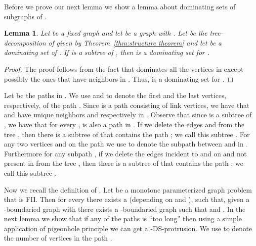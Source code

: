 \documentclass[11pt]{article}
\newtheorem{lemma}{Lemma}
\begin{document}
Before we prove our next lemma we show a lemma about dominating sets of subgraphs of .
\begin{lemma}
\label{lem:smalldominatingset}
Let  be a fixed graph and let  be a graph with .  
Let  be the tree-decomposition of  given by 
Theorem~\ref{thm:structure theorem} and let  be a dominating set of . If  is  a subtree of ,  then 
 is 
a dominating set for . 
\end{lemma}
\begin{proof}
The proof follows from the fact that  dominates all the vertices in  except possibly the ones that have 
neighbors in . Thus,  is 
a dominating set for . 
\end{proof}




Let  be the  paths in . We use  and  to denote the first  and the last vertices, respectively,  
of the path . Since  is a path consisting of link vertices,  we have that  and  have unique 
neighbors  and  respectively in .  Observe that since  is a subtree of , we have that for every 
,  is also a path in . 
If we delete the edges  and  from the tree , then there is a subtree of  that contains the path ; we call this subtree 
.  For any two vertices  and  on the path  we use  to denote the subpath between  and  in . 
Furthermore for  any subpath  , if we delete the edges incident to   and  on  and not present in   from the tree , then there is a subtree of  that contains the path ; we call this subtree  .   


Now we recall the definition of . Let  be a  monotone parameterized graph problem  that is FII. Then for every  there exists a  (depending on  and ), such that, given a -boundaried graph   with   there exists a -boundaried graph   such that  and  . 
In the next lemma we show that if any of the paths is ``too long'' then using a simple application of pigeonhole principle we can get a -{\sc DS}-protrusion. We use  to denote the number of vertices in the path .  
\end{document}
